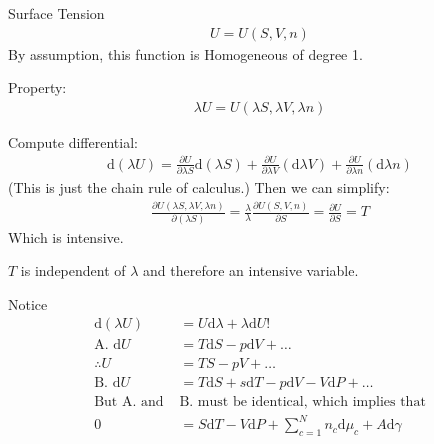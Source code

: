 \documentclass{article}
\renewcommand{\d}[0]{\mathrm{d}}
\newcommand{\pOne}[2]{\frac{\partial #1}{\partial #2}}
\begin{document}
\begin{section}{Surface Tension}
      \begin{align*}
	U = U(S,V,n)
      \end{align*}
      By assumption, this function is Homogeneous of degree 1.

      Property: 
      \begin{align*}
	\lambda U = U(\lambda S, \lambda V, \lambda n)
      \end{align*}

      Compute differential:
      \begin{align*}
	\d(\lambda U) = \pOne{U}{\lambda S} \d(\lambda S) + \pOne{U}{\lambda V}(\d\lambda V) + \pOne{U}{\lambda n}(\d\lambda n)
      \end{align*}
      (This is just the chain rule of calculus.) Then we can simplify:
      \begin{align*}
	\pOne{U(\lambda S, \lambda V, \lambda n)}{(\lambda S)} = \frac{\lambda}{\lambda}\pOne{U(S,V,n)}{S} = \pOne{U}{S} = T
      \end{align*}
      Which is intensive. 

      $T$ is independent of $\lambda$ and therefore an intensive variable.

      Notice 
      \begin{align*}
	\d(\lambda U) &= U \d \lambda + \lambda \d U!\\
	\text{A.\ \ \ \ \ \ } \d U &= T \d S - p\d V + \dots\\
	\therefore U &= TS - pV + \dots\\
	\text{B.\ \ \ \ \ \ } \d U &= T \d S + s\d T - p\d V - V\d P +\dots\\
	\text{But A. and }&\text{B. must be identical, which implies that}\\
	0 &= S \d T - V\d P +\sum_{c=1}^{N}n_c\d\mu_c + A\d\gamma
      \end{align*}
    \end{section}
\end{document}
